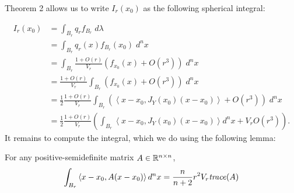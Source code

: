 	Theorem 2 allows us to write $I_r(x_0)$ as the following spherical integral: 

	\begin{align}
		I_r(x_0) &= \int_{B_r} q_r f_{B_r} \; d\lambda \\ 
		&= \int_{B_r} q_r(x) f_{B_r}(x_0)\; d^n x \\
		&= \int_{B_r} \frac{1 + O(r)}{V_r} \left(f_{x_0}(x) + O(r^3)\right) \; d^n x \\
		&= \frac{1 + O(r)}{V_r} \int_{B_r} \left(f_{x_0}(x) + O(r^3)\right) \; d^n x \\
		&= \frac{1}{2}\frac{1 + O(r)}{V_r} \int_{B_r} \left( \left<x - x_0, J_Y(x_0)(x - x_0)\right>  + O(r^3)\right) \; d^n x \\ 
		&= \frac{1}{2}\frac{1 + O(r)}{V_r} \left(\int_{B_r}  \left<x - x_0, J_Y(x_0)(x - x_0)\right> d^n x + V_rO(r^3)\right). 
	\end{align}
	It remains to compute the integral, which we do using the following lemma: 

	\begin{lm} For any positive-semidefinite matrix $A \in \mathbb{R}^{n\times n}$, 
			$$\int_{B_r} \left< x - x_0, A(x-x_0) \right> d^n x = \frac{n}{n+2} r^{2} V_r \text{\emph{trace}} (A)$$
	\end{lm}
		
